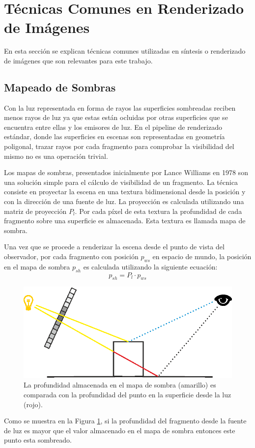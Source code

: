 \section{Técnicas Comunes en Renderizado de Imágenes}

En esta sección se explican técnicas comunes utilizadas en síntesis o renderizado de imágenes que son relevantes para este trabajo.
\subsection{Mapeado de Sombras}
\label{subsec:shadowmapping}
Con la luz representada en forma de rayos las superficies sombreadas reciben menos rayos de luz ya que estas están ocluidas por otras superficies que se encuentra entre ellas y los emisores de luz. En el pipeline de renderizado estándar, donde las superficies en escenas son representadas en geometría poligonal, trazar rayos por cada fragmento para comprobar la visibilidad del mismo no es una operación trivial.

Los mapas de sombras, presentados inicialmente por Lance Williams en 1978 \cite{Williams:78} son una solución simple para el cálculo de visibilidad de un fragmento. La técnica consiste en proyectar la escena en una textura bidimensional desde la posición y con la dirección de una fuente de luz. La proyección es calculada utilizando una matriz de proyección $P_{l}$. Por cada píxel de esta textura la profundidad de cada fragmento sobre una superficie es almacenada. Esta textura es llamada mapa de sombra.

Una vez que se procede a renderizar la escena desde el punto de vista del observador, por cada fragmento con posición $p_{ws}$ en espacio de mundo, la posición en el mapa de sombra $p_{sh}$ es calculada utilizando la siguiente ecuación:
\begin{equation}
    p_{sh} = P_{l} \cdot p_{ws}
    \label{eq:p_to_shadowmap}
\end{equation}
\begin{figure}[H]
	\centering
	\includegraphics[width=0.80\linewidth]{media/shadow_mapping.eps}
	\caption{La profundidad almacenada en el mapa de sombra (amarillo) es comparada con la profundidad del punto en la superficie desde la luz (rojo).}
	\label{fig:shadow_mapping}
\end{figure}
Como se muestra en la Figura \ref{fig:shadow_mapping}, si la profundidad del fragmento desde la fuente de luz es mayor que el valor almacenado en el mapa de sombra entonces este punto esta sombreado. 

